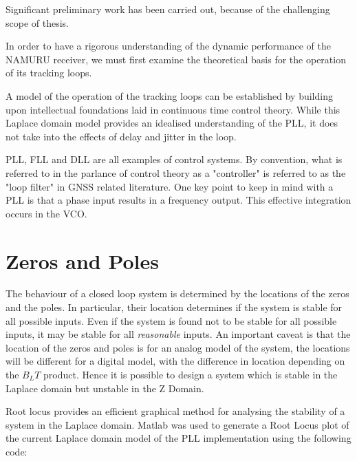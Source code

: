 Significant preliminary work has been carried out, because of the challenging scope of thesis. 

In order to have a rigorous understanding of the dynamic performance of the \ac{NAMURU} receiver, we must first examine the theoretical basis for the operation of its tracking loops. 

A model of the operation of the tracking loops can be established by building upon intellectual foundations laid in continuous time control theory. While this Laplace domain model provides an idealised understanding of the \ac{PLL}, it does not take into the effects of delay and jitter in the loop. 

\ac{PLL}, \ac{FLL} and \ac{DLL} are all examples of control systems. By convention, what is referred to in the parlance of control theory as a "controller" is referred to as the "loop filter" in \ac{GNSS} related literature. One key point to keep in mind with a \ac{PLL} is that a phase input results in a frequency output. This effective integration occurs in the \ac{VCO}.

\section{Zeros and Poles}
The behaviour of a closed loop system is determined by the locations of the zeros and the poles. In particular, their location determines if the system is stable for all possible inputs. Even if the system is found not to be stable for all possible inputs, it may be stable for all \emph{reasonable} inputs. An important caveat is that the location of the zeros and poles is for an analog model of the system, the locations will be different for a digital model, with the difference in location depending on the $B_LT$ product.  Hence it is possible to design a system which is stable in the Laplace domain but unstable in the Z Domain. 

Root locus provides an efficient graphical method for analysing the stability of a system in the Laplace domain\cite{Nise}. Matlab was used to generate a Root Locus plot of the current Laplace domain model of the \ac{PLL} implementation using the following code:

\begin{comment}
\begin{lstlisting}[frame=single]
Kvco =1;
Bn = 18;
a3 = 1.1;
b3 = 2.4;
omega = Bn/0.7845;
k1 = b3*omega;
k2 = a3*(omega^2);
k3 = omega^3;
%H is the forward transfer function
H = tf([Kvco*k1 Kvco*k2 Kvco*k3],[1 0 0 0]);
rlocus(H);
\end{lstlisting}
\end{comment}

